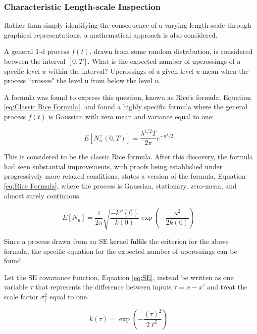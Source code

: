 \documentclass[12pt,a4paper]{article}
\begin{document}
\subsubsection{Characteristic Length-scale Inspection}

Rather than simply identifying the consequence of a varying length-scale through graphical representations, a mathematical approach is also considered.

A general 1-d process \(f(t)\), drawn from some random distribution, is considered between the interval \([0,T]\). What is the expected number of upcrossings of a specifc level \(u\) within the interval? Upcrossings of a given level \(u\) mean when the process ``crosses" the level u from below the level \(u\). 

A formula was found to express this question, known as Rice's formula, Equation \eqref{eq:Classic Rice Formula}. \citet{Rice1945} and \citet{Kac1943} found a highly specific formula where the general process \(f(t)\) is Gaussian with zero mean and variance equal to one:

\begin{equation}
E\left[N_u^+(0, T)\right] = \frac{\lambda^{1/2} T}{2\pi} e^{-u^2/2}
\label{eq:Classic Rice Formula}
\end{equation}

This is considered to be the classic Rice formula. After this discovery, the formula had seen substantial improvements, with proofs being established under progressively more relaxed conditions. \citet{adler2010geometry} states a version of the formula, Equation \eqref{eq:Rice Formula}, where the process is Gaussian, stationary, zero-mean, and almost surely continuous.

\begin{equation}
E[N_u] = \frac{1}{2\pi} \sqrt{\frac{-k''(0)}{k(0)}} \exp\left(-\frac{u^2}{2k(0)}\right)
\label{eq:Rice Formula}
\end{equation}

Since a process drawn from an SE kernel fulfils the criterion for the above formula, the specific equation for the expected number of upcrossings can be found.

Let the SE covariance function, Equation \eqref{eq:SE}, instead be written as one variable \(\tau\) that represents the difference between inputs \(\tau=x-x'\) and treat the scale factor \(\sigma_f^2\) equal to one.

\begin{equation}
k(\tau) = \exp\left(-\frac{(\tau)^2}{2\ell^2}\right)
\label{eq:SE(r)}
\end{equation}
\end{document}
